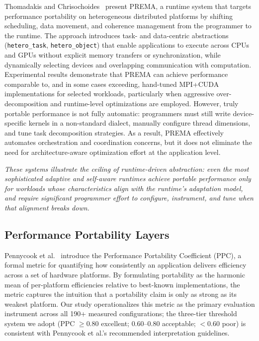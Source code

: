 Thomadakis and Chrisochoides~\cite{thomadakis2023prema} present PREMA, a runtime
system that targets performance portability on heterogeneous distributed
platforms by shifting scheduling, data movement, and coherence management from
the programmer to the runtime. The approach introduces task- and data-centric
abstractions (\texttt{hetero\_task}, \texttt{hetero\_object}) that enable
applications to execute across CPUs and GPUs without explicit memory transfers
or synchronization, while dynamically selecting devices and overlapping
communication with computation. Experimental results demonstrate that PREMA can
achieve performance comparable to, and in some cases exceeding, hand-tuned
MPI+CUDA implementations for selected workloads, particularly when aggressive
over-decomposition and runtime-level optimizations are employed. However, truly
portable performance is not fully automatic: programmers must still write
device-specific kernels in a non-standard dialect, manually configure thread
dimensions, and tune task decomposition strategies. As a result, PREMA
effectively automates orchestration and coordination concerns, but it does not
eliminate the need for architecture-aware optimization effort at the application
level.

\textit{These systems illustrate the ceiling of runtime-driven abstraction: even
the most sophisticated adaptive and self-aware runtimes achieve portable
performance only for workloads whose characteristics align with the runtime's
adaptation model, and require significant programmer effort to configure,
instrument, and tune when that alignment breaks down.}

\subsection{Performance Portability Layers}

Pennycook et al.~\cite{Pennycook2019} introduce the Performance Portability
Coefficient (PPC), a formal metric for quantifying how consistently an
application delivers efficiency across a set of hardware platforms. By
formulating portability as the harmonic mean of per-platform efficiencies
relative to best-known implementations, the metric captures the intuition that
a portability claim is only as strong as its weakest platform. Our study
operationalizes this metric as the primary evaluation instrument across all
190+ measured configurations; the three-tier threshold system we adopt
(PPC $\geq 0.80$ excellent; $0.60$--$0.80$ acceptable; $< 0.60$ poor) is
consistent with Pennycook et al.'s recommended interpretation guidelines.

